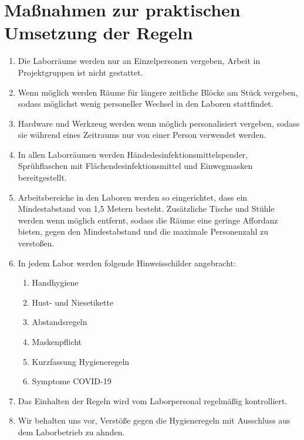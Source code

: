 \section{Maßnahmen zur praktischen Umsetzung der Regeln}\label{sec:umsetzung}

\begin{enumerate}
    \item Die Laborräume werden nur an Einzelpersonen vergeben, Arbeit in Projektgruppen ist nicht gestattet.
    \item Wenn möglich werden Räume für längere zeitliche Blöcke am Stück vergeben, sodass möglichst wenig personeller Wechsel in den Laboren stattfindet.
    \item Hardware und Werkzeug werden wenn möglich personalisiert vergeben, sodass sie während eines Zeitraums nur von einer Person verwendet werden.
    \item In allen Laborräumen werden Händedesinfektionsmittelspender, Sprühflaschen mit Flächendesinfektionsmittel und Einwegmasken bereitgestellt.
    \item Arbeitsbereiche in den Laboren werden so eingerichtet, dass ein Mindestabstand von 1,5 Metern besteht. Zusätzliche Tische und Stühle werden wenn möglich entfernt, sodass die Räume eine geringe Affordanz bieten, gegen den Mindestabstand und die maximale Personenzahl zu verstoßen.
    \item In jedem Labor werden folgende Hinweisschilder angebracht:
    \begin{enumerate}
        \item Handhygiene
        \item Hust- und Niesetikette
        \item Abstandsregeln
        \item Maskenpflicht
        \item Kurzfassung Hygieneregeln
        \item Symptome COVID-19
    \end{enumerate}
    \item Das Einhalten der Regeln wird vom Laborpersonal regelmäßig kontrolliert.
    \item Wir behalten uns vor, Verstöße gegen die Hygieneregeln mit Ausschluss aus dem Laborbetrieb zu ahnden.
\end{enumerate}
